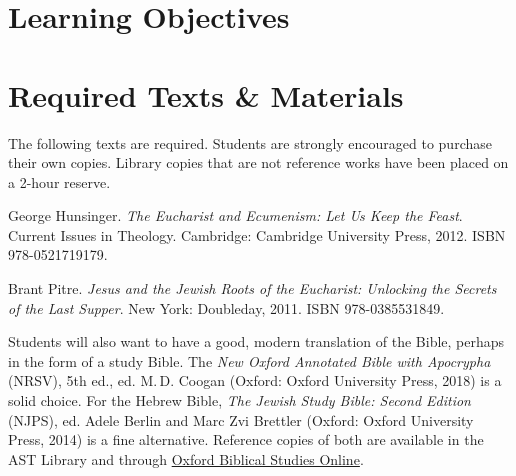 \documentclass[titlepage]{article}
\newcommand\incl{../includes}
\begin{document}


  \section{Learning Objectives}
  \label{objectives}

  \edobject

\section{Required Texts \& Materials}
\label{texts}

The following texts are required. Students are strongly encouraged to
purchase their own copies. Library copies that are not reference works
have been placed on a 2-hour reserve.

\begingroup
\renewcommand{\section}[2]{}%
\begin{thebibliography}{9}%

	 George Hunsinger.
	\emph{The Eucharist and Ecumenism: Let Us Keep the Feast}. Current Issues in Theology.
	Cambridge: Cambridge University Press, 2012. ISBN 978-0521719179.

	 Brant Pitre.
	\emph{Jesus and the Jewish Roots of the Eucharist: Unlocking the Secrets of the Last Supper}.
	New York: Doubleday, 2011. ISBN 978-0385531849.


%


\end{thebibliography}
\endgroup

Students will also want to have a good, modern translation of the Bible,
perhaps in the form of a study Bible. The \emph{New Oxford Annotated
Bible with Apocrypha} (NRSV), 5th ed., ed. M.\,D. Coogan (Oxford: Oxford
University Press, 2018) is a solid choice. For the Hebrew Bible,
\emph{The Jewish Study Bible: Second Edition} (NJPS), ed. Adele Berlin
and Marc Zvi Brettler (Oxford: Oxford University Press, 2014) is a fine
alternative. Reference copies of both are available in the AST Library
and through \href{http://ezproxy.astheology.ns.ca:2048/login?url=http://www.oxfordbiblicalstudies.com/}{Oxford Biblical Studies Online}.
\end{document}
